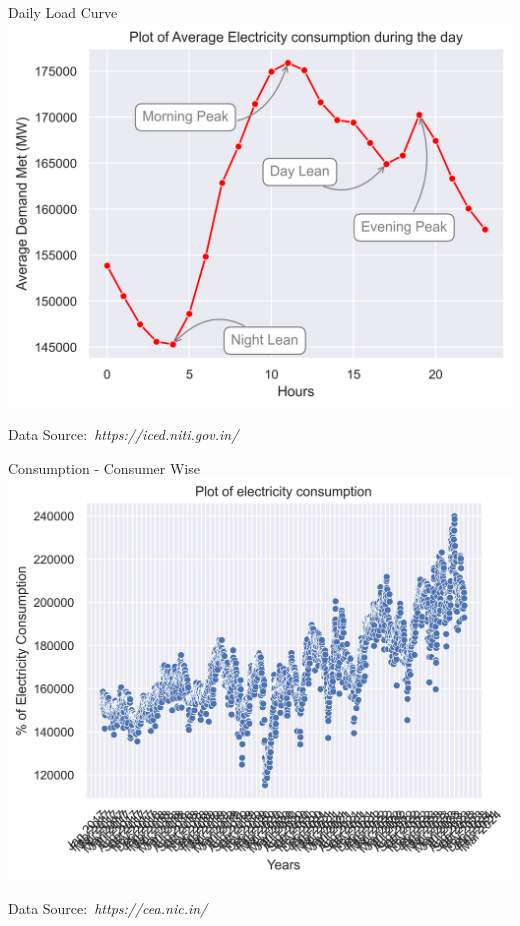 \documentclass{beamer}
\newcommand{\credit}[1]{\par\hfill \footnotesize Data Source:~\itshape#1}
\begin{document}
\begin{frame}{Daily Load Curve}
\centering
\includegraphics[scale=.60]{images/Load Curve.png}
\credit{https://iced.niti.gov.in/}
\end{frame}

\begin{frame}{Consumption - Consumer Wise}
\centering
\includegraphics[scale=.55]{images/Cons_Ind_wise.png}
\credit{https://cea.nic.in/}
\end{frame}
\end{document}
